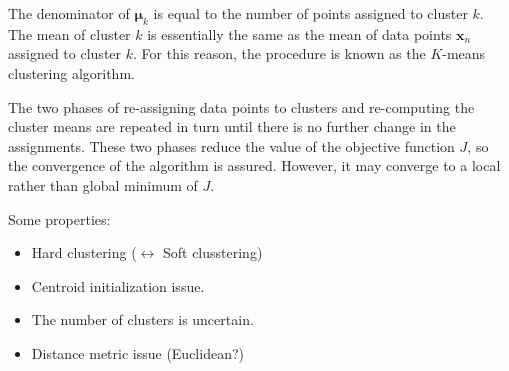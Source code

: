 
The denominator of $\boldsymbol{\mu}_k$ is equal to the number of points assigned to cluster $k$. The mean of cluster $k$ is essentially the same as the mean of data points $\mathbf{x}_n$ assigned to cluster $k$. For this reason, the procedure is known as the $K$-means clustering algorithm. 

The two phases of re-assigning data points to clusters and re-computing the cluster means are repeated in turn until there is no further change in the assignments. These two phases reduce the value of the objective function $J$, so the convergence of the algorithm is assured. However, it may converge to a local rather than global minimum of $J$. 

Some properties:
\begin{itemize}
	\item Hard clustering ($\leftrightarrow$ Soft clusstering)
	\item Centroid initialization issue.
	\item The number of clusters is uncertain. 
	\item Distance metric issue (\eg Euclidean?)
\end{itemize}


